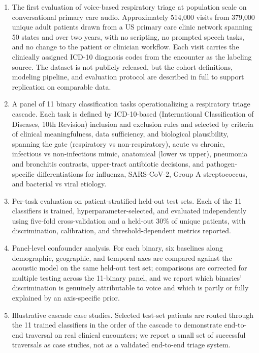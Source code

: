 \documentclass[utf8]{FrontiersinHarvard} %
\begin{document}
\begin{enumerate}
\item The first evaluation of voice-based respiratory triage at population scale on conversational primary care audio. Approximately 514{,}000 visits from 379{,}000 unique adult patients drawn from a US primary care clinic network spanning 50 states and over two years, with no scripting, no prompted speech tasks, and no change to the patient or clinician workflow. Each visit carries the clinically assigned ICD-10 diagnosis codes from the encounter as the labeling source. The dataset is not publicly released, but the cohort definitions, modeling pipeline, and evaluation protocol are described in full to support replication on comparable data.

\item A panel of 11 binary classification tasks operationalizing a respiratory triage cascade. Each task is defined by ICD-10-based (International Classification of Diseases, 10th Revision) inclusion and exclusion rules and selected by criteria of clinical meaningfulness, data sufficiency, and biological plausibility, spanning the gate (respiratory vs non-respiratory), acute vs chronic, infectious vs non-infectious mimic, anatomical (lower vs upper), pneumonia and bronchitis contrasts, upper-tract antibiotic decisions, and pathogen-specific differentiations for influenza, SARS-CoV-2, Group A streptococcus, and bacterial vs viral etiology.

\item Per-task evaluation on patient-stratified held-out test sets. Each of the 11 classifiers is trained, hyperparameter-selected, and evaluated independently using five-fold cross-validation and a held-out 30\% of unique patients, with discrimination, calibration, and threshold-dependent metrics reported.

\item Panel-level confounder analysis. For each binary, six baselines along demographic, geographic, and temporal axes are compared against the acoustic model on the same held-out test set; comparisons are corrected for multiple testing across the 11-binary panel, and we report which binaries' discrimination is genuinely attributable to voice and which is partly or fully explained by an axis-specific prior.

\item Illustrative cascade case studies. Selected test-set patients are routed through the 11 trained classifiers in the order of the cascade to demonstrate end-to-end traversal on real clinical encounters; we report a small set of successful traversals as case studies, not as a validated end-to-end triage system.
\end{enumerate}
\end{document}
